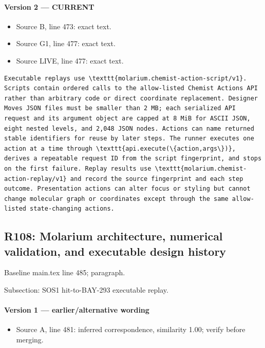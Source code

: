 \documentclass[11pt]{article}
\begin{document}
\paragraph{Version 2 --- CURRENT}

\begin{itemize}[leftmargin=*]
\item Source B, line 473: exact text.
\item Source G1, line 477: exact text.
\item Source LIVE, line 477: exact text.
\end{itemize}

\begin{lstlisting}
Executable replays use \texttt{molarium.chemist-action-script/v1}. Scripts contain ordered calls to the allow-listed Chemist Actions API rather than arbitrary code or direct coordinate replacement. Designer Moves JSON files must be smaller than 2 MB; each serialized API request and its argument object are capped at 8 MiB for ASCII JSON, eight nested levels, and 2,048 JSON nodes. Actions can name returned stable identifiers for reuse by later steps. The runner executes one action at a time through \texttt{api.execute(\{action,args\})}, derives a repeatable request ID from the script fingerprint, and stops on the first failure. Replay results use \texttt{molarium.chemist-action-replay/v1} and record the source fingerprint and each step outcome. Presentation actions can alter focus or styling but cannot change molecular graph or coordinates except through the same allow-listed state-changing actions.
\end{lstlisting}

\subsection{R108: Molarium architecture, numerical validation, and executable design history}

Baseline main.tex line 485; paragraph.

Subsection: SOS1 hit-to-BAY-293 executable replay.

\paragraph{Version 1 --- earlier/alternative wording}

\begin{itemize}[leftmargin=*]
\item Source A, line 481: inferred correspondence, similarity 1.00; verify before merging.
\end{itemize}
\end{document}
